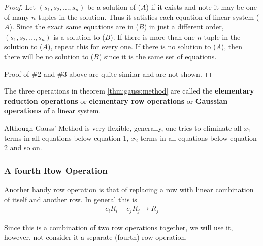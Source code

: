 \begin{proof}
Let $(s_1,s_2, \ldots, s_n)$ be a solution of ($A$) if it exists and note it may be one of many $n$-tuples in the solution.  Thus it satisfies each equation of linear system ($A$).  Since the exact same equations are in ($B$) in just a different order, $(s_1,s_2,\ldots,s_n)$ is a solution to ($B$).   If there is more than one $n$-tuple in the solution to ($A$), repeat this for every one.  If there is no solution to ($A$), then there will be no solution to ($B$) since it is the same set of equations.  

Proof of \#2 and \#3 above are quite similar and are not shown.  
\end{proof}


\begin{definition}
The three operations in theorem \ref{thm:gauss:method} are called the \textbf{elementary reduction operations} or \textbf{elementary row operations} or \textbf{Gaussian operations} of a linear system.  
\end{definition}

\pagebreak

\begin{Boxed*}
Although Gauss' Method is very flexible, generally, one tries to eliminate all $x_1$ terms in all equations below equation 1, $x_2$ terms in all equations below equation 2 and so on.  
\end{Boxed*}


\subsubsection{A fourth Row Operation}

Another handy row operation is that of replacing a row with linear combination of itself and another row.  In general this is
%
\begin{align*}
c_i R_i + c_j R_j \rightarrow R_j
\end{align*}

Since this is a combination of two row operations together, we will use it, however, not consider it a separate (fourth) row operation.  



